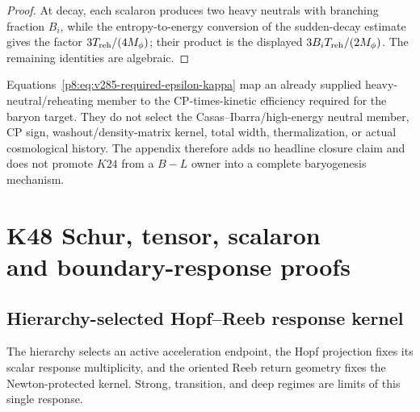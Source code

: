 \documentclass[12pt,a4paper]{article}
\begin{document}
\begin{proof}
At decay, each scalaron produces two heavy neutrals with branching fraction
\(B_i\), while the entropy-to-energy conversion of the sudden-decay estimate
gives the factor \(3T_{\rm reh}/(4M_\phi)\); their product is the displayed
\(3B_iT_{\rm reh}/(2M_\phi)\).  The remaining identities are algebraic.
\end{proof}

\begin{remark}
Equations~\eqref{p8:eq:v285-required-epsilon-kappa} map an already supplied
heavy-neutral/reheating member to the CP-times-kinetic efficiency required for
the baryon target.  They do not select the Casas--Ibarra/high-energy neutral
member, CP sign, washout/density-matrix kernel, total width, thermalization,
or actual cosmological history.  The appendix therefore adds no headline
closure claim and does not promote \(K24\) from a \(B-L\) owner into a
complete baryogenesis mechanism.
\end{remark}



\section[K48 Schur, tensor, scalaron and boundary-response proofs]{K48 Schur, tensor, scalaron\\ and boundary-response proofs}
\label{p6c:sec:c4}
\subsection{Hierarchy-selected Hopf--Reeb response kernel}
\label{p8:sec:hierarchy-selected-reeb-response}
The hierarchy selects an active acceleration endpoint, the Hopf projection fixes its scalar response multiplicity, and the oriented Reeb return geometry fixes the Newton-protected kernel.  Strong, transition, and deep regimes are limits of this single response.
\end{document}
